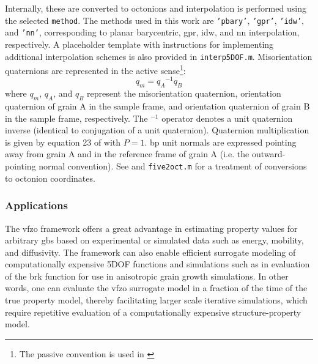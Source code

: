 \documentclass[final,twocolumn,12pt]{elsarticle}
\begin{document}
Internally, these are converted to octonions and interpolation is performed using the selected \texttt{method}. The methods used in this work are \texttt{'pbary'}, \texttt{'gpr'}, \texttt{'idw'}, and \texttt{'nn'}, corresponding to planar barycentric, \gls{gpr}, \gls{idw}, and \gls{nn} interpolation, respectively. A placeholder template with instructions for implementing additional interpolation schemes is also provided in \texttt{interp5DOF.m}. Misorientation quaternions are represented in the active sense\footnote{The passive convention is used in \cite{francisGeodesicOctonionMetric2019}}:
\begin{equation}
    q_m = {q_A}^{-1}q_B
\end{equation}
where $q_m$, $q_A$, and $q_B$ represent the misorientation quaternion, orientation quaternion of grain A in the sample frame, and orientation quaternion of grain B in the sample frame, respectively. The $^{-1}$ operator denotes a unit quaternion inverse (identical to conjugation of a unit quaternion). Quaternion multiplication is given by equation 23 of \cite{rowenhorstConsistentRepresentationsConversions2015} with $P=1$. \Gls{bp} unit normals are expressed pointing away from grain A and in the reference frame of grain A (i.e. the outward-pointing normal convention). See \cite{francisGeodesicOctonionMetric2019} and \texttt{five2oct.m} \cite{bairdFiveDegreeofFreedom5DOF2020} for a treatment of conversions to octonion coordinates.

\subsubsection{Applications}

The \gls{vfzo} framework offers a great advantage in estimating property values for arbitrary \glspl{gb} based on experimental or simulated data such as energy, mobility, and diffusivity. The framework can also enable efficient surrogate modeling of computationally expensive 5DOF functions and simulations such as in evaluation of the \gls{brk} function \cite{bulatovGrainBoundaryEnergy2014} for use in anisotropic grain growth simulations. In other words, one can evaluate the \gls{vfzo} surrogate model in a fraction of the time of the true property model, thereby facilitating larger scale iterative simulations, which require repetitive evaluation of a computationally expensive structure-property model.

\end{document}
